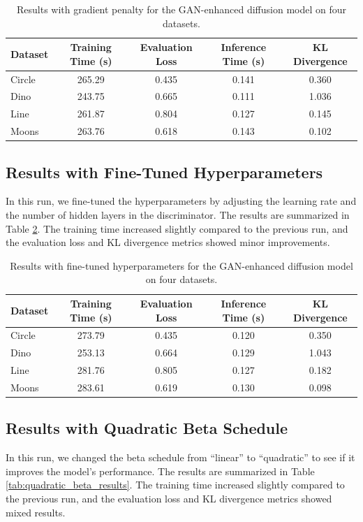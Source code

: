 \documentclass{article} %
\begin{document}
\begin{table}[h]
    \centering
    \begin{tabular}{lcccc}
        \toprule
        Dataset & Training Time (s) & Evaluation Loss & Inference Time (s) & KL Divergence \\
        \midrule
        Circle & 265.29 & 0.435 & 0.141 & 0.360 \\
        Dino & 243.75 & 0.665 & 0.111 & 1.036 \\
        Line & 261.87 & 0.804 & 0.127 & 0.145 \\
        Moons & 263.76 & 0.618 & 0.143 & 0.102 \\
        \bottomrule
    \end{tabular}
    \caption{Results with gradient penalty for the GAN-enhanced diffusion model on four datasets.}
    \label{tab:gradient_penalty_results}
\end{table}

\subsection{Results with Fine-Tuned Hyperparameters}
In this run, we fine-tuned the hyperparameters by adjusting the learning rate and the number of hidden layers in the discriminator. The results are summarized in Table \ref{tab:fine_tuned_results}. The training time increased slightly compared to the previous run, and the evaluation loss and KL divergence metrics showed minor improvements.

\begin{table}[h]
    \centering
    \begin{tabular}{lcccc}
        \toprule
        Dataset & Training Time (s) & Evaluation Loss & Inference Time (s) & KL Divergence \\
        \midrule
        Circle & 273.79 & 0.435 & 0.120 & 0.350 \\
        Dino & 253.13 & 0.664 & 0.129 & 1.043 \\
        Line & 281.76 & 0.805 & 0.127 & 0.182 \\
        Moons & 283.61 & 0.619 & 0.130 & 0.098 \\
        \bottomrule
    \end{tabular}
    \caption{Results with fine-tuned hyperparameters for the GAN-enhanced diffusion model on four datasets.}
    \label{tab:fine_tuned_results}
\end{table}

\subsection{Results with Quadratic Beta Schedule}
In this run, we changed the beta schedule from ``linear'' to ``quadratic'' to see if it improves the model's performance. The results are summarized in Table \ref{tab:quadratic_beta_results}. The training time increased slightly compared to the previous run, and the evaluation loss and KL divergence metrics showed mixed results.
\end{document}

